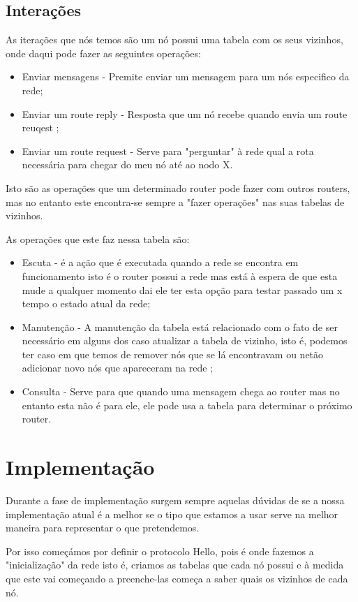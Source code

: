 \documentclass{llncs}
\begin{document}
\subsection{Interações}
As iterações que nós temos são um nó possui uma tabela com os seus vizinhos, onde daqui pode fazer as seguintes operações:
\begin{itemize}
\item Enviar mensagens - Premite enviar um mensagem para um nós especifico da rede;
\item Enviar um route reply - Resposta que um nó recebe quando envia um route reuqest ;
\item Enviar um route request - Serve para "perguntar" à rede qual a rota necessária para chegar do meu nó até ao nodo X.
\end{itemize}

Isto são as operações que um determinado router pode fazer com outros routers, mas no entanto este encontra-se sempre a "fazer operações" nas suas tabelas de vizinhos.

As operações que este faz nessa tabela são:
\begin{itemize}
\item Escuta - é a ação que é executada quando a rede se encontra em funcionamento isto é o router possui a rede mas está à espera de que esta mude a qualquer momento dai ele ter esta opção para testar passado um x tempo o estado atual da rede;
\item Manutenção - A manutenção da tabela está relacionado com o fato de ser necessário em alguns dos caso atualizar a tabela de vizinho, isto é, podemos ter caso em que temos de remover nós que se lá encontravam ou netão adicionar novo nós que apareceram na rede ;
\item Consulta - Serve para que quando uma mensagem chega ao router mas no entanto esta não é para ele, ele pode usa a tabela para determinar o próximo router.
\end{itemize}

\section{Implementação}

Durante a fase de implementação surgem  sempre aquelas dúvidas de se a nossa implementação atual é a melhor se o tipo que estamos a usar serve na melhor maneira para representar o que pretendemos.

Por isso começámos por definir o protocolo Hello, pois é onde fazemos a "inicialização" da rede isto é, criamos as tabelas que cada nó possui e à medida que este vai começando a preenche-las começa a saber quais os vizinhos de cada nó.
\end{document}
